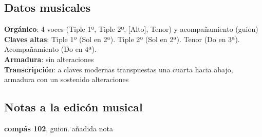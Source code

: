 \subsection*{Datos musicales}
\noindent \textbf{Orgánico}: 4 voces (Tiple 1º, Tiple 2º, [Alto], Tenor) y acompañamiento (guion)\\
\textbf{Claves altas}: Tiple 1º (Sol en 2ª). Tiple 2º (Sol en 2ª). Tenor (Do en 3ª). Acompañamiento (Do en 4ª).\\
\textbf{Armadura}: sin alteraciones\\
\textbf{Transcripción}: a claves modernas transpuestas una cuarta hacia abajo, armadura con un sostenido alteraciones


\subsection*{Notas a la edicón musical}
\noindent \textbf{compás 102}, guion. añadida nota
